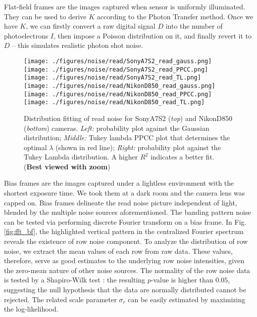 \documentclass[10pt,twocolumn,letterpaper]{article}
\begin{document}
Flat-field frames are the images captured when sensor is uniformly illuminated.
They can be used to derive $K$ according to the Photon Transfer method.
\cite{Janesick1985CCD}Once we have $K$, we can firstly convert a raw digital signal $D$ into the number of photoelectrons $I$, then impose a Poisson distribution on it, and finally revert it to $D$ -- this simulates realistic photon shot noise.



\begin{figure}[!t]
\centering
\texttt{[image: ./figures/noise/read/SonyA7S2\_read\_gauss.png]}
\texttt{[image: ./figures/noise/read/SonyA7S2\_read\_PPCC.png]}
\texttt{[image: ./figures/noise/read/SonyA7S2\_read\_TL.png]} \\
\texttt{[image: ./figures/noise/read/NikonD850\_read\_gauss.png]}
\texttt{[image: ./figures/noise/read/NikonD850\_read\_PPCC.png]}
\texttt{[image: ./figures/noise/read/NikonD850\_read\_TL.png]} \\
\vspace{-1mm}
\caption{Distribution fitting of read noise for SonyA7S2 (\textit{top}) and  NikonD850 (\textit{bottom}) cameras. \textit{Left:} probability plot against the Gaussian distribution;
\textit{Middle:} Tukey lambda PPCC plot that determines the optimal $\lambda$ (shown in red line); \textit{Right:} probability plot against the Tukey Lambda distribution. A higher $R^2$ indicates a better fit. (\textbf{Best viewed with zoom})}
\vspace{0mm}
\label{fig:TL-PPCC}
\end{figure}

Bias frames are the images captured under a lightless environment with the
shortest exposure time. We took them at a dark room and the camera lens was capped on. 
Bias frames delineate the read noise picture independent of light, blended by the multiple noise sources aforementioned. 
The banding pattern noise can be tested via performing discrete Fourier transform on a bias frame.  In Fig.\ref{fig:fft_bf},  the highlighted vertical pattern in the centralized Fourier spectrum reveals the existence of row noise component. 
To analyze the distribution of row noise, we extract the
mean values of each row from raw data. These values, therefore, serve as good
estimates to the underlying row noise intensities, given the zero-mean nature
of other noise sources.  
The normality
of the row noise data is tested by a Shapiro-Wilk test \cite{Shapiro1975An}: the resulting $p$-value is higher than $0.05$, suggesting the null hypothesis that the data are normally distributed cannot be rejected. 
The related scale parameter $\sigma_r$ can be easily
estimated by maximizing the log-likelihood.
\end{document}
